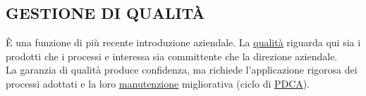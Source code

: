 		\subsection{GESTIONE DI QUALITÀ}   \label{gestionequalita}
		È una funzione di più recente introduzione aziendale. La \underline{\hyperref[qualita]{qualità}} riguarda qui sia i prodotti che i processi e interessa sia committente che la direzione aziendale. \\
		La garanzia di qualità produce confidenza, ma richiede l'applicazione rigorosa dei processi adottati e la loro \underline{\hyperref[manutenzione]{manutenzione}} migliorativa (ciclo di \underline{\hyperref[pdca]{PDCA}}).
